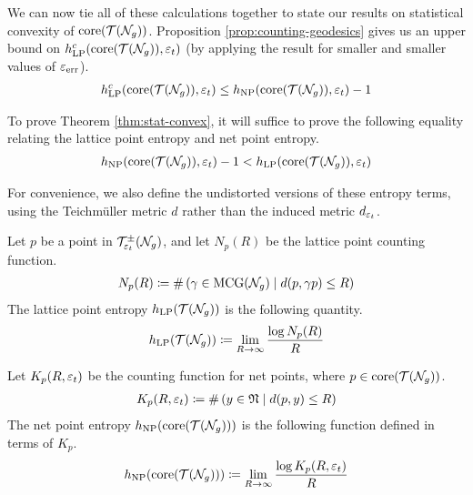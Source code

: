 We can now tie all of these calculations together to state our results on statistical convexity of $\mathrm{core}(\mathcal{T}(\mathcal{N}_g))$.
Proposition \ref{prop:counting-geodesics} gives us an upper bound on $h_{\mathrm{LP}}^c(\mathrm{core}(\mathcal{T}(\mathcal{N}_g)), \varepsilon_t)$ (by applying the result for smaller and smaller values of $\varepsilon_{\mathrm{err}}$).
\begin{align}
  \label{eq:bad-entropy-bound}
  h_{\mathrm{LP}}^c(\mathrm{core}(\mathcal{T}(\mathcal{N}_g)), \varepsilon_t) \leq h_{\mathrm{NP}}(\mathrm{core}(\mathcal{T}(\mathcal{N}_g)), \varepsilon_t) - 1
\end{align}

To prove Theorem \ref{thm:stat-convex}, it will suffice to prove the following equality relating the lattice point entropy and net point entropy.
\begin{align}
  \label{eq:net-and-lattice-condition}
  h_{\mathrm{NP}}(\mathrm{core}(\mathcal{T}(\mathcal{N}_g)), \varepsilon_t) - 1 < h_{\mathrm{LP}}(\mathrm{core}(\mathcal{T}(\mathcal{N}_g)), \varepsilon_t)
\end{align}

For convenience, we also define the undistorted versions of these entropy terms, using the Teichmüller metric $d$ rather than the induced metric $d_{\varepsilon_t}$.

\begin{definition}
  Let $p$ be a point in $\mathcal{T}_{\varepsilon_t}^{\pm}(\mathcal{N}_g)$, and let $N_p(R)$ be the lattice point counting function.
  \begin{align*}
    N_p(R) \coloneqq \#\left( \gamma \in \mathrm{MCG}(\mathcal{N}_g) \mid d(p, \gamma p) \leq R \right)
  \end{align*}
  The lattice point entropy $h_{\mathrm{LP}}(\mathcal{T}(\mathcal{N}_g))$ is the following quantity.
  \begin{align*}
    h_{\mathrm{LP}}(\mathcal{T}(\mathcal{N}_g)) \coloneqq \lim_{R \to \infty} \frac{\log N_p(R)}{R}
  \end{align*}
\end{definition}

\begin{definition}
  Let $K_p(R, \varepsilon_t)$ be the counting function for net points, where $p \in \mathrm{core}(\mathcal{T}(\mathcal{N}_g))$.
  \begin{align*}
    K_p(R, \varepsilon_t) \coloneqq \#\left( y \in \mathfrak{N} \mid d(p, y) \leq R \right)
  \end{align*}
  The net point entropy $h_{\mathrm{NP}}(\mathrm{core}(\mathcal{T}(\mathcal{N}_g)))$ is the following function defined in terms of $K_p$.
  \begin{align*}
    h_{\mathrm{NP}}(\mathrm{core}(\mathcal{T}(\mathcal{N}_g))) \coloneqq \lim_{R \to \infty} \frac{\log K_p(R, \varepsilon_t)}{R}
  \end{align*}
\end{definition}

